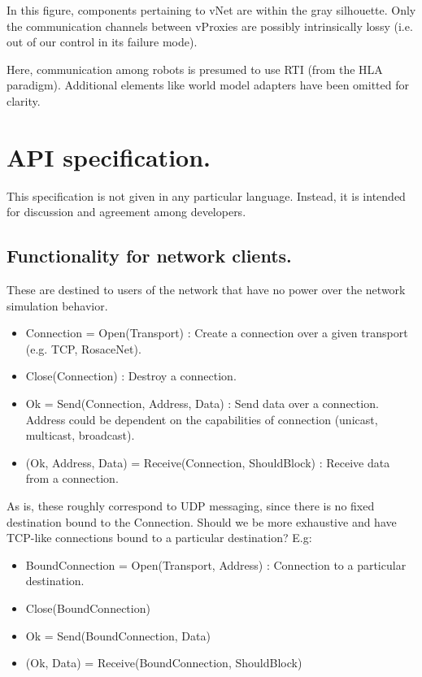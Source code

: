 \documentclass[a4paper,11pt]{article}
\begin{document}
In this figure, components pertaining to vNet are within the gray silhouette.
Only the communication channels between vProxies are possibly intrinsically
lossy (i.e. out of our control in its failure mode).

Here, communication among robots is presumed to use RTI (from the HLA
paradigm). Additional elements like world model adapters have been omitted for
clarity.

\section{API specification.}

This specification is not given in any particular language. Instead, it is
intended for discussion and agreement among developers.

\subsection{Functionality for network clients.}

These are destined to users of the network that have no power over the network
simulation behavior.

\begin{itemize}
    \item Connection = Open(Transport) : Create a connection over a given
transport (e.g. TCP, RosaceNet).
    \item Close(Connection) : Destroy a connection.
    \item Ok = Send(Connection, Address, Data) : Send data over a connection.
Address could be dependent on the capabilities of connection (unicast,
multicast, broadcast).
    \item (Ok, Address, Data) = Receive(Connection, ShouldBlock) : Receive
data from a connection.
\end{itemize}

As is, these roughly correspond to UDP messaging, since there is no fixed
destination bound to the Connection. Should we be more exhaustive and have
TCP-like connections bound to a particular destination? E.g:

\begin{itemize}
    \item BoundConnection = Open(Transport, Address) : Connection to a
particular destination.
    \item Close(BoundConnection)
    \item Ok = Send(BoundConnection, Data)
    \item (Ok, Data) = Receive(BoundConnection, ShouldBlock)
\end{itemize}
\end{document}
